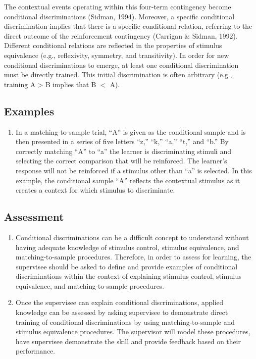 The contextual events operating within this four-term contingency become conditional discriminations (Sidman, 1994).   Moreover, a specific conditional discrimination implies that there is a specific conditional relation, referring to the direct outcome of the reinforcement contingency (Carrigan \& Sidman, 1992).  Different conditional relations are reflected in the properties of stimulus equivalence (e.g., reflexivity, symmetry, and transitivity).  In order for new conditional discriminations to emerge, at least one conditional discrimination must be directly trained.  This initial discrimination is often arbitrary (e.g., training A > B implies that B $<$ A). 
%
\subsection{Examples}
\begin{enumerate}
\item In a matching-to-sample trial, ``A'' is given as the conditional sample and is then presented in a series of five letters ``z,'' ``k,'' ``a,'' ``t,'' and ``b.''  By correctly matching ``A'' to ``a'' the learner is discriminating stimuli and selecting the correct comparison that will be reinforced.  The learner's response will not be reinforced if a stimulus other than ``a'' is selected.  In this example, the conditional sample ``A'' reflects the contextual stimulus as it creates a context for which stimulus to discriminate.  
%
\end{enumerate}
%
\subsection{Assessment}
\begin{enumerate}
\item Conditional discriminations can be a difficult concept to understand without having adequate knowledge of stimulus control, stimulus equivalence, and matching-to-sample procedures.  Therefore, in order to assess for learning, the supervisee should be asked to define and provide examples of conditional discriminations within the context of explaining stimulus control, stimulus equivalence, and matching-to-sample procedures.
\item Once the supervisee can explain conditional discriminations, applied knowledge can be assessed by asking supervisee to demonstrate direct training of conditional discriminations by using matching-to-sample and stimulus equivalence procedures.  The supervisor will model these procedures, have supervisee demonstrate the skill and provide feedback based on their performance.  
%
\end{enumerate}
%
